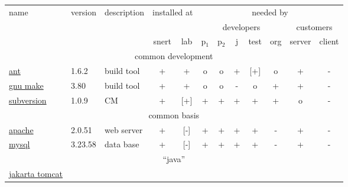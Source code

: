 
  \begin{tabular}[t]{|lll|cc|ccccccc|}
    \hline
    name & version & description & \multicolumn{2}{|c|}{installed at} & \multicolumn{7}{|c|}{needed by}
    \\
    &
    &
    &
    &
    &
    \multicolumn{5}{|c}{developers}
    &
    \multicolumn{2}{c|}{customers}
    \\
    & &
    &
    snert
    &
    lab
    &
    p$_1$
    &
    p$_2$
    &
    j
    &
    test
    &
    org
    &
    server%
    &
    client%
    \\\hline%
    \multicolumn{12}{|c|}{common development}
    \\\hline
    \href{http://ant.apache.org/}{ant} 
    &
    1.6.2 %
    &
    build tool %
    & 
    +  %
    & 
    +  %
    &
    o %
    &
    o %
    &
    + %
    &
    [+] %
    & 
    o %
    &
    + %
    &
    - %
    \\
    \href{http://www.gnu.org/software/make}{gnu make} 
    &
    3.80 %
    &
    build tool %
    & 
    +  %
    & 
    +  %
    &
    o %
    &
    o %
    &
    - %
    &
    o %
    & 
    + %
    &
    + %
    &
    - %
    \\
    \href{http://subversion.tigris.org/}{subversion}
    &
    1.0.9 %
    & 
    CM %
    & 
    +  %
    & 
    [+]  %
    &
    + %
    &
    + %
    &
    + %
    &
    + %
    & 
    + %
    &
    o %
    &
    - %
    \\\hline
    \multicolumn{12}{|c|}{common basis}
    \\\hline
    \href{http://www.apache.org}{apache}
    &
    2.0.51 %
    & 
    web server %
    & 
    +  %
    & 
    [-]  %
    &
    + %
    &
    + %
    &
    + %
    &
    + %
    & 
    - %
    &
    + %
    &
    - %
    \\
    \href{http://www.mysql.org}{mysql}
    &
    3.23.58 %
    & 
    data base %
    & 
    +  %
    & 
    [-]  %
    &
    + %
    &
    + %
    &
    + %
    &
    + %
    & 
    - %
    &
    + %
    &
    - %
    \\\hline
    \multicolumn{12}{|c|}{``java''}
    \\\hline
    \href{http://jakarta.apache.org/tomcat/index.html}{jakarta tomcat}

\end{tabular}
